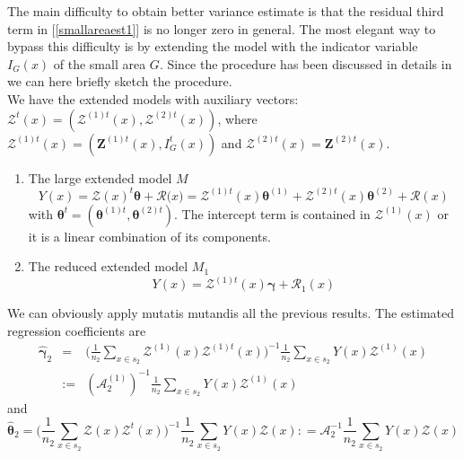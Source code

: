 \documentclass[a4paper,12pt,leqno, titlepage]{article}
\begin{document}
The main difficulty to obtain better variance estimate is that the residual third term in [\ref{smallareaest1}] is no longer zero in general. The most elegant way to bypass this difficulty is by extending the model with the indicator variable $I_G(x)$ of the small area $G$. Since the procedure has been discussed in details in \cite{mandallazreport1, mandallazreport2, mandallaz3, mandallaz4} we can here briefly sketch the procedure.\\
We have the extended models with auxiliary vectors:
$\pmb{\mathcal{Z}}^t(x)=(\pmb{\mathcal{Z}}^{(1)t}(x),\pmb{\mathcal{Z}}^{(2)t}(x))$,
where $\pmb{\mathcal{Z}}^{(1)t}(x)=(\pmb{Z}^{(1)t}(x), I_G^t(x))$ and $\pmb{\mathcal{Z}}^{(2)t}(x)=\pmb{Z}^{(2)t}(x)$.
\begin{enumerate}
 \item
 The large extended model $M$
 \begin{equation*}
 Y(x)=\pmb{\mathcal{Z}}(x)^t\pmb{\theta}+ \mathcal{R(}x)=\pmb{\mathcal{Z}}^{(1)t}(x)\pmb{\theta}^{(1)}
 +\pmb{\mathcal{Z}}^{(2)t}(x)\pmb{\theta}^{(2)}+ \mathcal{R}(x)
 \end{equation*}
 \noindent with $\pmb{\theta}^t=({\pmb{\theta}^{(1)t}}, {\pmb{\theta}^{(2)t}})$.
 The intercept term is contained in $\pmb{\mathcal{Z}}^{(1)}(x)$ or it is a linear combination of its components.
 \item
 The reduced extended model $M_1$
 \begin{equation*}
 Y(x)=\pmb{\mathcal{Z}}^{(1)t}(x)\pmb{\gamma} + \mathcal{R}_1(x)
 \end{equation*}
\end{enumerate}
We can obviously apply mutatis mutandis all the previous results. The estimated regression coefficients are
\begin{eqnarray}\label{extcoeff1}
\hat{\pmb{\gamma}}_2 &=& \Big(\frac{1}{n_2}\sum_{x\in{s}_2}\pmb{\mathcal{Z}}^{(1)}(x)\pmb{\mathcal{Z}}^{(1)t}(x)
\Big)^{-1}\frac{1}{n_2}\sum_{x\in{s}_2}Y(x)\pmb{\mathcal{Z}}^{(1)}(x)\nonumber\\
&:=&(\pmb{\mathcal{A}}^{(1)}_2)^{-1}
\frac{1}{n_2}\sum_{x\in{s}_2}Y(x)\pmb{\mathcal{Z}}^{(1)}(x)
\end{eqnarray}
and
\begin{equation}\label{extcoeff2}
\hat{\pmb{\theta}}_{2}=\Big(\frac{1}{n_2}\sum_{x\in{s}_2}\pmb{\mathcal{Z}}(x)\pmb{\mathcal{Z}}^t(x)
\Big)^{-1}\frac{1}{n_2}\sum_{x\in{s}_2}Y(x)\pmb{\mathcal{Z}}(x):
=\pmb{\mathcal{A}}^{-1}_2\frac{1}{n_2}\sum_{x\in{s}_2}Y(x)\pmb{\mathcal{Z}}(x)
\end{equation}
\end{document}
